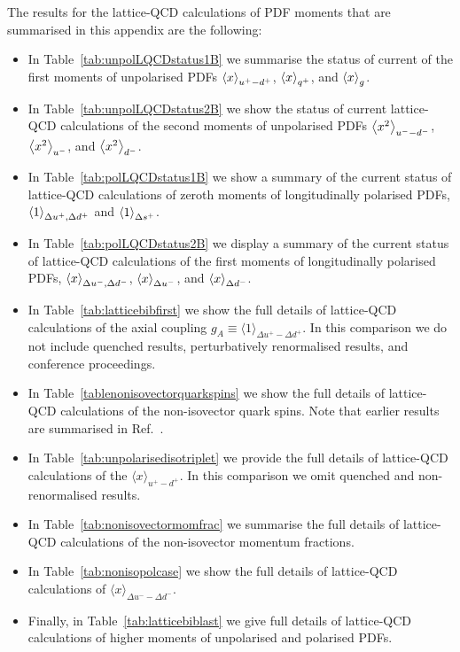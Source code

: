 The results for the lattice-QCD calculations of PDF moments that are summarised
in this appendix are the following:
\begin{itemize}

  \item In Table~\ref{tab:unpolLQCDstatus1B}
we summarise the status of current  of the
first moments of unpolarised PDFs $\left\langle x\right\rangle_{u^+-d^+}$, $\left\langle x\right\rangle_{q^+}$,
and $\left\langle x\right\rangle_g$.

\item In Table~\ref{tab:unpolLQCDstatus2B} we show
  the status of current lattice-QCD calculations of the second moments of unpolarised PDFs
  $\left\langle x^2\right\rangle_{u^--d^-}$, $\left\langle x^2\right\rangle_{u^-}$,
and $\left\langle x^2\right\rangle_{d^-}$.

\item In Table~\ref{tab:polLQCDstatus1B} we show
  a summary of the current status of lattice-QCD calculations of zeroth moments of
  longitudinally polarised PDFs,
  $\left\langle 1\right\rangle_{\Delta u^+,\Delta d^+}$ and $\left\langle 1\right\rangle_{\Delta s^+}$.

\item In Table~\ref{tab:polLQCDstatus2B} we display a summary of the current status of lattice-QCD calculations of the first moments of longitudinally polarised PDFs,
  $\left\langle x\right\rangle_{\Delta u^-,\Delta d^-}$, $\left\langle x\right\rangle_{\Delta u^-}$, and  $\left\langle x\right\rangle_{\Delta d^-}$.

\item In Table~\ref{tab:latticebibfirst} we show the full details of lattice-QCD calculations
  of the axial coupling $g_A\equiv\langle 1\rangle_{\Delta u^+-\Delta d^+}$.
  In this comparison we do not include
quenched results, perturbatively renormalised results, and conference proceedings.

\item In Table~\ref{tablenonisovectorquarkspins} we show
  the full details of lattice-QCD calculations of the non-isovector quark spins.
  Note that
  earlier results are summarised in Ref.~\cite{Liu:1995kb}.

\item In Table~\ref{tab:unpolarisedisotriplet} we provide the full details of
  lattice-QCD calculations of the $\langle x\rangle_{u^+-d^+}$.
  In this comparison we
  omit quenched and non-renormalised results.

\item In Table~\ref{tab:nonisovectormomfrac}
  we summarise
  the full details of lattice-QCD calculations of the non-isovector momentum fractions.

\item In Table~\ref{tab:nonisopolcase}
  we show the full details of lattice-QCD calculations of $\langle x\rangle_{\Delta u^--\Delta d^-}$.

\item Finally, in  Table~\ref{tab:latticebiblast} we
  give full details of lattice-QCD calculations of higher moments of unpolarised
  and polarised PDFs.

\end{itemize}

